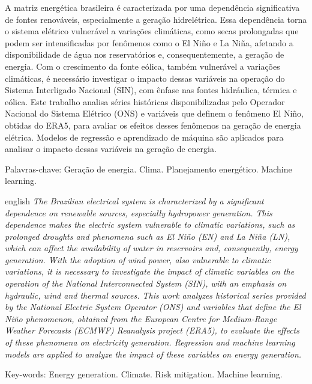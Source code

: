 \begin{resumo}
\noindent
A matriz energética brasileira é caracterizada por uma dependência significativa de fontes renováveis, especialmente a
geração hidrelétrica. Essa dependência torna o sistema elétrico vulnerável a variações climáticas, como secas 
prolongadas que podem ser intensificadas por fenômenos como o El Niño e La Niña, afetando a disponibilidade 
de água nos reservatórios e, consequentemente, a geração de energia. Com o crescimento da fonte eólica, também vulnerável a 
variações climáticas, é necessário investigar o impacto dessas variáveis na operação do Sistema Interligado Nacional 
(SIN), com ênfase nas fontes hidráulica, térmica e eólica. Este trabalho analisa séries históricas disponibilizadas pelo Operador Nacional 
do Sistema Elétrico (ONS) e variáveis que definem o fenômeno El Niño, obtidas do ERA5, para avaliar os efeitos desses fenômenos
na geração de energia elétrica. Modelos de regressão e aprendizado de máquina são aplicados para analisar
o impacto dessas variáveis na geração de energia.

\vspace{0.2cm}
\noindent
Palavras-chave: Geração de energia. Clima. Planejamento energético. Machine learning.
\end{resumo}

\begin{resumo}[Abstract]	
\begin{otherlanguage*}{english}
\noindent 
\textit{The Brazilian electrical system is characterized by a significant dependence on renewable sources, especially hydropower generation. 
This dependence makes the electric system vulnerable to climatic variations, such as prolonged droughts and phenomena such as
El Niño (EN) and La Niña (LN), which can affect the availability of water in reservoirs and, consequently, energy generation. 
With the adoption of wind power, also vulnerable to climatic variations, it is necessary to investigate the impact of 
climatic variables on the operation of the National Interconnected System (SIN), with an emphasis on hydraulic, wind and 
thermal sources. This work analyzes historical series provided by the National Electric System Operator (ONS) and variables 
that define the El Niño phenomenon, obtained from the European Centre for Medium-Range Weather Forecasts (ECMWF) 
Reanalysis project (ERA5), to evaluate the effects of these phenomena on electricity generation. 
Regression and machine learning models are applied to analyze the impact of these variables on energy generation.}

\vspace{0.2cm}
\noindent
Key-words: Energy generation. Climate. Risk mitigation. Machine learning.
\end{otherlanguage*}
\end{resumo}